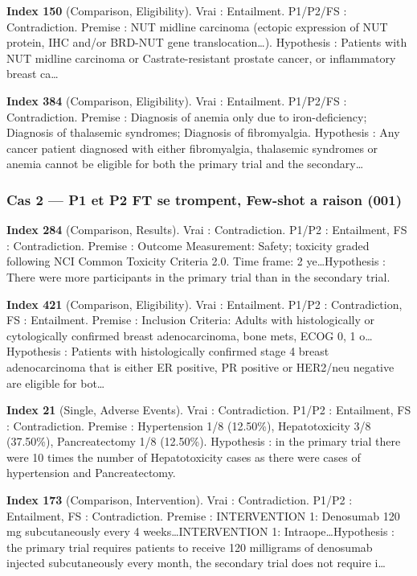 \documentclass[11pt,a4paper]{article}
\begin{document}
\textbf{Index 150} (Comparison, Eligibility). Vrai : Entailment. P1/P2/FS : Contradiction. Premise : NUT midline carcinoma (ectopic expression of NUT protein, IHC and/or BRD-NUT gene translocation\ldots). Hypothesis : Patients with NUT midline carcinoma or Castrate-resistant prostate cancer, or inflammatory breast ca\ldots

\textbf{Index 384} (Comparison, Eligibility). Vrai : Entailment. P1/P2/FS : Contradiction. Premise : Diagnosis of anemia only due to iron-deficiency; Diagnosis of thalasemic syndromes; Diagnosis of fibromyalgia. Hypothesis : Any cancer patient diagnosed with either fibromyalgia, thalasemic syndromes or anemia cannot be eligible for both the primary trial and the secondary\ldots

\subsubsection*{Cas 2 — P1 et P2 FT se trompent, Few-shot a raison (001)}
\textbf{Index 284} (Comparison, Results). Vrai : Contradiction. P1/P2 : Entailment, FS : Contradiction. Premise : Outcome Measurement: Safety; toxicity graded following NCI Common Toxicity Criteria 2.0. Time frame: 2 ye\ldots Hypothesis : There were more participants in the primary trial than in the secondary trial.

\textbf{Index 421} (Comparison, Eligibility). Vrai : Entailment. P1/P2 : Contradiction, FS : Entailment. Premise : Inclusion Criteria: Adults with histologically or cytologically confirmed breast adenocarcinoma, bone mets, ECOG 0, 1 o\ldots Hypothesis : Patients with histologically confirmed stage 4 breast adenocarcinoma that is either ER positive, PR positive or HER2/neu negative are eligible for bot\ldots

\textbf{Index 21} (Single, Adverse Events). Vrai : Contradiction. P1/P2 : Entailment, FS : Contradiction. Premise : Hypertension 1/8 (12.50\%), Hepatotoxicity 3/8 (37.50\%), Pancreatectomy 1/8 (12.50\%). Hypothesis : in the primary trial there were 10 times the number of Hepatotoxicity cases as there were cases of hypertension and Pancreatectomy.

\textbf{Index 173} (Comparison, Intervention). Vrai : Contradiction. P1/P2 : Entailment, FS : Contradiction. Premise : INTERVENTION 1: Denosumab 120 mg subcutaneously every 4 weeks\ldots INTERVENTION 1: Intraope\ldots Hypothesis : the primary trial requires patients to receive 120 milligrams of denosumab injected subcutaneously every month, the secondary trial does not require i\ldots
\end{document}
